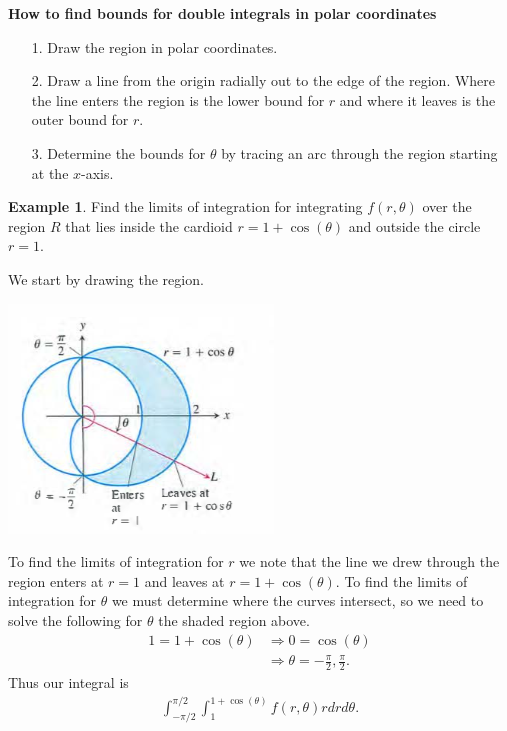 \documentclass[12pt, letter]{article}
\theoremstyle{plain}
\numberwithin{theorem}{section}
\theoremstyle{definition}
\newtheorem{example}[theorem]{Example}
\begin{document}
\hrulefill

\bigskip

\textbf{How to find bounds for double integrals in polar coordinates}
\begin{itemize}
\item[1.] Draw the region in polar coordinates.
\item[2.] Draw a line from the origin radially out to the edge of the region. Where the line enters the region is the lower bound for $r$ and where it leaves is the outer bound for $r$.
\item[3.] Determine the bounds for $\theta$ by tracing an arc through the region starting at the $x$-axis.
\end{itemize}

\bigskip

\hrulefill

\bigskip

\begin{example}
Find the limits of integration for integrating $f(r,\theta)$ over the region $R$ that lies inside the cardioid $r=1+\cos(\theta)$ and outside the circle $r=1$.

\bigskip

We start by drawing the region.

\bigskip

\begin{center}
\includegraphics[scale=0.7]{m3_f14}
\end{center}

\bigskip

To find the limits of integration for $r$ we note that the line we drew through the region enters at $r=1$ and leaves at $r=1+\cos(\theta)$. To find the limits of integration for $\theta$ we must determine where the curves intersect, so we need to solve the following for $\theta$  the shaded region above.
\begin{align*}
1=1+\cos(\theta) &\Rightarrow 0 = \cos(\theta)\\
&\Rightarrow \theta = -\frac{\pi}{2}, \frac{\pi}{2}.
\end{align*}
Thus our integral is
\begin{align*}
\int_{-\pi/2}^{\pi/2} \int_1^{1+\cos(\theta)} f(r,\theta) rdrd\theta.
\end{align*}

\end{example}
\end{document}

